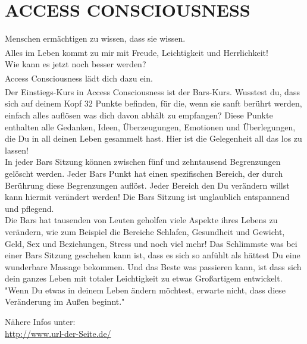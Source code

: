 \documentclass[10pt,foldmark,notumble]{leaflet}
\begin{document}
\newpage
\section{ACCESS CONSCIOUSNESS \textsuperscript{\textregistered}}

\begin{flushleft}
Menschen ermächtigen zu wissen, dass sie wissen.\\
\vspace*{4mm}
Alles im Leben kommt zu mir mit Freude, Leichtigkeit und Herrlichkeit!\textsuperscript{\textregistered}\\
\vspace*{4mm}
Wie kann es jetzt noch besser werden? \\
\vspace*{4mm}
Access Consciousness\textsuperscript{\textregistered} lädt dich dazu ein. \\
\vspace*{4mm}
Der Einstiegs-Kurs in Access Consciousness\textsuperscript{\textregistered} ist der Bars-Kurs. Wusstest du, dass sich auf deinem Kopf 32 Punkte befinden, für die, wenn sie sanft berührt werden, einfach alles auflösen was dich davon abhält zu empfangen? Diese Punkte enthalten alle Gedanken, Ideen, Überzeugungen, Emotionen und Überlegungen, die Du in all deinen Leben gesammelt hast. Hier ist die Gelegenheit all das los zu lassen!\\
\vspace*{4mm}
In jeder Bars Sitzung können zwischen fünf und zehntausend Begrenzungen gelöscht werden. Jeder Bars Punkt hat einen spezifischen Bereich, der durch Berührung diese Begrenzungen auflöst. Jeder Bereich den Du verändern willst kann hiermit verändert werden! Die Bars Sitzung ist unglaublich entspannend und pflegend.\\
\vspace*{4mm}
Die Bars hat tausenden von Leuten geholfen viele Aspekte ihres Lebens zu verändern, wie zum Beispiel die Bereiche Schlafen, Gesundheit und Gewicht, Geld, Sex und Beziehungen, Stress und noch viel mehr! Das Schlimmste was bei einer Bars Sitzung geschehen kann ist, dass es sich so anfühlt als hättest Du eine wunderbare Massage bekommen. Und das Beste was passieren kann, ist dass sich dein ganzes Leben mit totaler Leichtigkeit zu etwas Großartigem entwickelt.\\
\vspace*{4mm}
"Wenn Du etwas in deinem Leben ändern möchtest, erwarte nicht, dass diese Veränderung im Außen beginnt."\\
\end{flushleft}

\begin{center}
Nähere Infos unter:\\
{\url{http://www.url-der-Seite.de/}} \\
\end{center}
\end{document}
